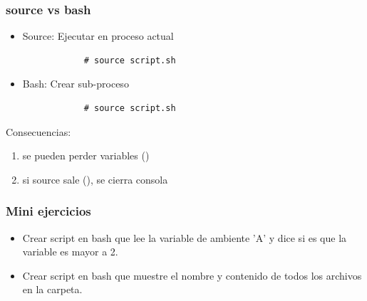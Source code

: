 \documentclass[14pt,aspectratio=169,xcolor=dvipsnames]{beamer}
\begin{document}
\begin{frame}[fragile]\frametitle{source vs bash}
    \begin{itemize}
        \item Source: Ejecutar en proceso actual
        \begin{verbatim}
            # source script.sh
        \end{verbatim}
        \item Bash: Crear sub-proceso
        \begin{verbatim}
            # source script.sh
        \end{verbatim}
    \end{itemize}

Consecuencias: 
    \begin{enumerate}
        \item se pueden perder variables ()
        \item  si source sale (), se cierra consola
    \end{enumerate}


\end{frame}
\begin{frame}
    \maketitle
\end{frame}
\begin{frame}[noframenumbering]\frametitle{Mini ejercicios}
    \begin{itemize}
        \item Crear script en bash que lee la variable de ambiente 'A' y dice si es que la variable es mayor a 2.
        \item Crear script en bash que muestre el nombre y contenido de todos los archivos  en la carpeta.
    \end{itemize}
\end{frame}
\end{document}
